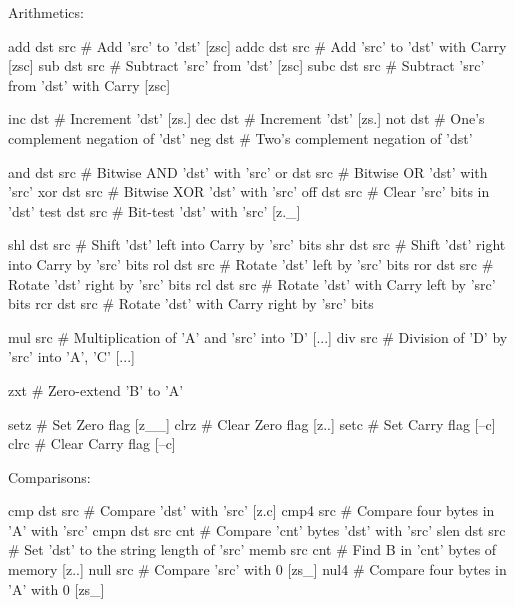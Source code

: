 Arithmetics:

\begin{wideverbatim}
add dst src       # Add 'src' to 'dst' [zsc]
addc dst src      # Add 'src' to 'dst' with Carry [zsc]
sub dst src       # Subtract 'src' from 'dst' [zsc]
subc dst src      # Subtract 'src' from 'dst' with Carry [zsc]

inc dst           # Increment 'dst' [zs.]
dec dst           # Increment 'dst' [zs.]
not dst           # One's complement negation of 'dst'
neg dst           # Two's complement negation of 'dst'

and dst src       # Bitwise AND 'dst' with 'src'
or dst src        # Bitwise OR 'dst' with 'src'
xor dst src       # Bitwise XOR 'dst' with 'src'
off dst src       # Clear 'src' bits in 'dst'
test dst src      # Bit-test 'dst' with 'src' [z._]

\end{wideverbatim}

\begin{wideverbatim}

shl dst src       # Shift 'dst' left into Carry by 'src' bits
shr dst src       # Shift 'dst' right into Carry by 'src' bits
rol dst src       # Rotate 'dst' left by 'src' bits
ror dst src       # Rotate 'dst' right by 'src' bits
rcl dst src       # Rotate 'dst' with Carry left by 'src' bits
rcr dst src       # Rotate 'dst' with Carry right by 'src' bits

mul src           # Multiplication of 'A' and 'src' into 'D' [...]
div src           # Division of 'D' by 'src' into 'A', 'C' [...]

zxt               # Zero-extend 'B' to 'A'

setz              # Set Zero flag [z__]
clrz              # Clear Zero flag [z..]
setc              # Set Carry flag [--c]
clrc              # Clear Carry flag [--c]
\end{wideverbatim}

Comparisons:

\begin{wideverbatim}
cmp dst src       # Compare 'dst' with 'src' [z.c]
cmp4 src          # Compare four bytes in 'A' with 'src'
cmpn dst src cnt  # Compare 'cnt' bytes 'dst' with 'src'
slen dst src      # Set 'dst' to the string length of 'src'
memb src cnt      # Find B in 'cnt' bytes of memory [z..]
null src          # Compare 'src' with 0 [zs_]
nul4              # Compare four bytes in 'A' with 0 [zs_]
\end{wideverbatim}

